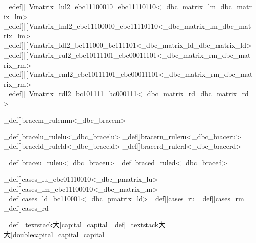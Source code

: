 \brl@char_edef[||]{Vmatrix_lul2}{\brl@char_ebc11100010\brl@char_ebc11110110}<\brl@char@alias_dbc_matrix_lm\brl@char@alias_dbc_matrix_lm>
\brl@char_edef[||]{Vmatrix_lml2}{\brl@char_ebc11100010\brl@char_ebc11110110}<\brl@char@alias_dbc_matrix_lm\brl@char@alias_dbc_matrix_lm>
\brl@char_edef[||]{Vmatrix_ldl2}{\brl@char_bc111000\brl@char_bc111101}<\brl@char@alias_dbc_matrix_ld\brl@char@alias_dbc_matrix_ld>
\brl@char_edef[||]{Vmatrix_rul2}{\brl@char_ebc10111101\brl@char_ebc00011101}<\brl@char@alias_dbc_matrix_rm\brl@char@alias_dbc_matrix_rm>
\brl@char_edef[||]{Vmatrix_rml2}{\brl@char_ebc10111101\brl@char_ebc00011101}<\brl@char@alias_dbc_matrix_rm\brl@char@alias_dbc_matrix_rm>
\brl@char_edef[||]{Vmatrix_rdl2}{\brl@char_bc101111\brl@char_bc000111}<\brl@char@alias_dbc_matrix_rd\brl@char@alias_dbc_matrix_rd>



\brl@char_def[\brl@orig@vrule\@width\brl@char@meanfontsize{}\brl@char@meanfontsize]{bracem}{\brl@char@alias_rulemm}<\brl@char@alias_dbc_bracem>

\brl@char_def[]{bracelu}{\brl@char@alias_rulelu}<\brl@char@alias_dbc_bracelu>
\brl@char_def[]{braceru}{\brl@char@alias_ruleru}<\brl@char@alias_dbc_braceru>
\brl@char_def[]{braceld}{\brl@char@alias_ruleld}<\brl@char@alias_dbc_braceld>
\brl@char_def[]{bracerd}{\brl@char@alias_rulerd}<\brl@char@alias_dbc_bracerd>

\brl@char_def[]{braceu}{\brl@char@alias_ruleu}<\brl@char@alias_dbc_braceu>
\brl@char_def[]{braced}{\brl@char@alias_ruled}<\brl@char@alias_dbc_braced>



\brl@char_def[]{cases_lu}{\brl@char_ebc01110010}<\brl@char@alias_dbc_pmatrix_lu>
\brl@char_def[]{cases_lm}{\brl@char_ebc11100010}<\brl@char@alias_dbc_matrix_lm>
\brl@char_def[]{cases_ld}{\brl@char_bc110001}<\brl@char@alias_dbc_pmatrix_ld>
\brl@char_def[]{cases_ru}{}
\brl@char_def[]{cases_rm}{}
\brl@char_def[]{cases_rd}{}



\brl@char_def[\brl@char_textstack{大}{}]{capital}{\brl@char@alias_capital}
\brl@char_def[\brl@char_textstack{大大}{}]{doublecapital}{\brl@char@alias_capital\brl@char@alias_capital}



